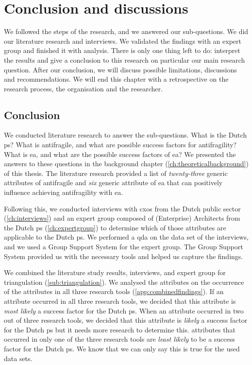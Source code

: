 \chapter{Conclusion and discussions}
\label{ch:conclusionanddiscussions}
We followed the steps of the research, and we answered our sub-questions. We did our literature research and interviews. We validated the findings with an expert group and finished it with analysis. There is only one thing left to do: interpret the results and give a conclusion to this research on particular our main research question. After our conclusion, we will discuss possible limitations, discussions and recommendations. We will end this chapter with a retrospective on the research process, the organisation and the researcher.

\section{Conclusion}
\label{sec:conclusion}
We conducted literature research to answer the sub-questions. What is the Dutch \gls{ps}? What is \gls{antifragile}, and what are possible success factors for \gls{antifragility}? What is \acrlong{ea}, and what are the possible success factors of \acrlong{ea}? We presented the answers to these questions in the background chapter (\cref{ch:theoreticalbackground}) of this thesis. The literature research provided a list of \textit{twenty-three} generic \glspl{attribute} of \gls{antifragile} and \textit{six} generic \gls{attribute} of \acrlong{ea} that can positively influence achieving \gls{antifragility} with \acrlong{ea}.

Following this, we conducted interviews with \glspl{cxo} from the Dutch public sector (\cref{ch:interviews}) and an expert group composed of (Enterprise) Architects from the Dutch \gls{ps} (\cref{ch:expertgroup}) to determine which of those \glspl{attribute} are applicable to the Dutch \gls{ps}. We performed a \acrlong{qda} on the data set of the interviews, and we used a Group Support System for the expert group. The Group Support System provided us with the necessary tools and helped us capture the findings. 

We combined the literature study results, interviews, and expert group for \gls{triangulation} (\cref{sub:triangulation}). We analysed the \glspl{attribute} on the occurrence of the \glspl{attribute} in all three research tools (\cref{app:combinedfindings}). If an \gls{attribute} occurred in all three research tools, we decided that this \gls{attribute} is \textit{most likely} a success factor for the Dutch \gls{ps}. When an \gls{attribute} occurred in two out of three research tools, we decided that this \gls{attribute} is \textit{likely} a success factor for the Dutch \gls{ps} but it needs more research to determine this. \Glspl{attribute} that occurred in only one of the three research tools are \textit{least likely} to be a success factor for the Dutch \gls{ps}. We know that we can only say this is true for the used data sets.

